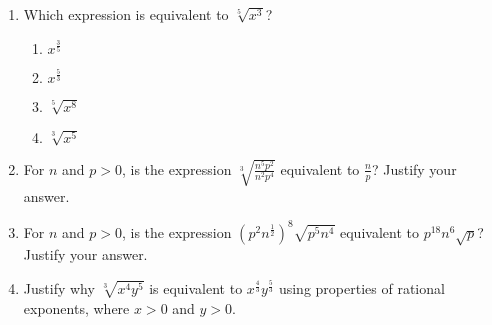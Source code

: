 \documentclass[12pt, twoside]{article}
\begin{document}
\begin{enumerate}
\item Which expression is equivalent to \( \sqrt[5]{x^3} \)?
\begin{enumerate}
    \item \( x^{\frac{3}{5}} \)
    \item \( x^{\frac{5}{3}} \)
    \item \( \sqrt[5]{x^8} \)
    \item \( \sqrt[3]{x^5} \)
\end{enumerate}

\item For \( n \) and \( p > 0 \), is the expression \( \sqrt[3]{\frac{n^5 p^2}{n^2 p^4}} \) equivalent to \( \frac{n}{p} \)? Justify your answer.


\item For \( n \) and \( p > 0 \), is the expression \(\displaystyle \left( p^2 n^{\frac{1}{2}} \right)^8 \sqrt{p^5 n^4} \) equivalent to \( p^{18} n^6 \sqrt{p} \)? Justify your answer.

\item Justify why \(\sqrt[3]{x^4 y^5}\) is equivalent to \(x^{\frac{4}{3}} y^{\frac{5}{3}}\) using properties of rational exponents, where \(x > 0\) and \(y > 0\).


\end{enumerate}
\end{document}
